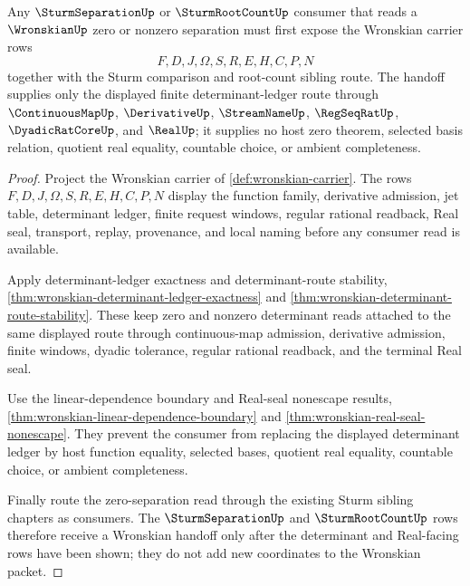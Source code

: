 \begin{theorem}
\label{thm:wronskian-sturm-separation-handoff}
Any $\SturmSeparationUp$ or $\SturmRootCountUp$ consumer that reads a $\WronskianUp$ zero or nonzero separation must first expose the Wronskian carrier rows
$$
F,D,J,\Omega,S,R,E,H,C,P,N
$$
together with the Sturm comparison and root-count sibling route. The handoff supplies only the displayed finite determinant-ledger route through $\ContinuousMapUp$, $\DerivativeUp$, $\StreamNameUp$, $\RegSeqRatUp$, $\DyadicRatCoreUp$, and $\RealUp$; it supplies no host zero theorem, selected basis relation, quotient real equality, countable choice, or ambient completeness.
\end{theorem}
\begin{proof}
Project the Wronskian carrier of \autoref{def:wronskian-carrier}. The rows $F,D,J,\Omega,S,R,E,H,C,P,N$ display the function family, derivative admission, jet table, determinant ledger, finite request windows, regular rational readback, Real seal, transport, replay, provenance, and local naming before any consumer read is available.

Apply determinant-ledger exactness and determinant-route stability, \autoref{thm:wronskian-determinant-ledger-exactness} and \autoref{thm:wronskian-determinant-route-stability}. These keep zero and nonzero determinant reads attached to the same displayed route through continuous-map admission, derivative admission, finite windows, dyadic tolerance, regular rational readback, and the terminal Real seal.

Use the linear-dependence boundary and Real-seal nonescape results, \autoref{thm:wronskian-linear-dependence-boundary} and \autoref{thm:wronskian-real-seal-nonescape}. They prevent the consumer from replacing the displayed determinant ledger by host function equality, selected bases, quotient real equality, countable choice, or ambient completeness.

Finally route the zero-separation read through the existing Sturm sibling chapters as consumers. The $\SturmSeparationUp$ and $\SturmRootCountUp$ rows therefore receive a Wronskian handoff only after the determinant and Real-facing rows have been shown; they do not add new coordinates to the Wronskian packet.
\end{proof}

